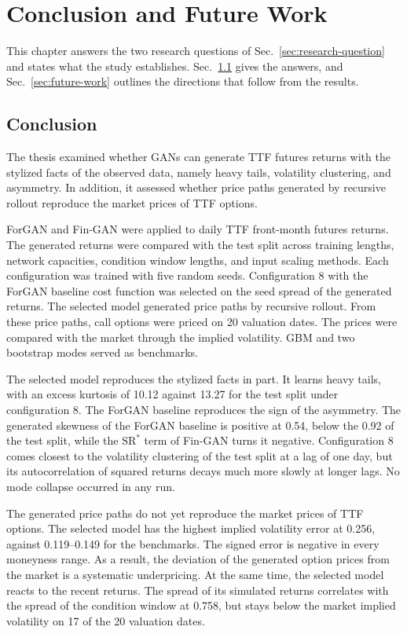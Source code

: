 \section{Conclusion and Future Work}\label{sec:conclusion-outlook}
This chapter answers the two research questions of Sec.~\ref{sec:research-question} and states what the study establishes. Sec.~\ref{sec:conclusion} gives the answers, and Sec.~\ref{sec:future-work} outlines the directions that follow from the results.

\subsection{Conclusion}\label{sec:conclusion}
The thesis examined whether GANs can generate TTF futures returns with the stylized facts of the observed data, namely heavy tails, volatility clustering, and asymmetry. In addition, it assessed whether price paths generated by recursive rollout reproduce the market prices of TTF options.

ForGAN and Fin-GAN were applied to daily TTF front-month futures returns. The generated returns were compared with the test split across training lengths, network capacities, condition window lengths, and input scaling methods. Each configuration was trained with five random seeds. Configuration 8 with the ForGAN baseline cost function was selected on the seed spread of the generated returns. The selected model generated price paths by recursive rollout. From these price paths, call options were priced on \num{20} valuation dates. The prices were compared with the market through the implied volatility. GBM and two bootstrap modes served as benchmarks.

The selected model reproduces the stylized facts in part. It learns heavy tails, with an excess kurtosis of \num{10.12} against \num{13.27} for the test split under configuration 8. The ForGAN baseline reproduces the sign of the asymmetry. The generated skewness of the ForGAN baseline is positive at \num{0.54}, below the \num{0.92} of the test split, while the $\mathrm{SR}^{*}$ term of Fin-GAN turns it negative. Configuration 8 comes closest to the volatility clustering of the test split at a lag of one day, but its autocorrelation of squared returns decays much more slowly at longer lags. No mode collapse occurred in any run.

The generated price paths do not yet reproduce the market prices of TTF options. The selected model has the highest implied volatility error at \num{0.256}, against \numrange{0.119}{0.149} for the benchmarks. The signed error is negative in every moneyness range. As a result, the deviation of the generated option prices from the market is a systematic underpricing. At the same time, the selected model reacts to the recent returns. The spread of its simulated returns correlates with the spread of the condition window at \num{0.758}, but stays below the market implied volatility on \num{17} of the \num{20} valuation dates.

